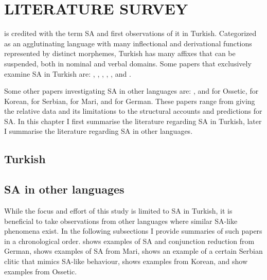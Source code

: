\chapter{\MakeUppercase{Literature Survey}} \label{litsurvey}


\cite{geoffrey1967turkish} is credited with the term SA and first observations of it in Turkish. Categorized as an agglutinating language with many inflectional and derivational functions represented by distinct morphemes, Turkish has many affixes that can be suspended, both in nominal and verbal domains. Some papers that exclusively examine SA in Turkish are: \cite{orgun1995flat}, \cite{kabak2007turkish}, \cite{broadwell2008turkish}, \cite{kornfilt2012revisiting}, \cite{kharytonava2012word,kharytonava2012taming}, and \cite{akkucs2016suspended}.

Some other papers investigating SA in other languages are: \cite{erschler2012suspended}, and \cite{erschler2018suspended} for Ossetic, \cite{yoon2017lexical} for Korean, \cite{despic2017suspended} for Serbian, \cite{guseva2017postsyntactic} for Mari, and \cite{pounder2006broken} for German. These papers range from giving the relative data and its limitations to the structural accounts and predictions for SA. In this chapter I first summarise the literature regarding SA in Turkish, later I summarise the literature regarding SA in other languages.


\section{Turkish}
















\section{SA in other languages}

While the focus and effort of this study is limited to SA in Turkish, it is beneficial to take observations from other languages where similar SA-like phenomena exist. In the following subsections I provide summaries of such papers in a chronological order. \cite{pounder2006broken} shows examples of SA and conjunction reduction from German, \cite{guseva2017postsyntactic} shows examples of SA from Mari, \cite{despic2017suspended} shows an example of a certain Serbian clitic that mimics SA-like behaviour, \cite{yoon2017lexical} shows examples from Korean, and \cite{erschler2012suspended,erschler2018suspended} show examples from Ossetic.











